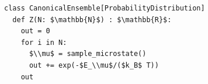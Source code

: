 \documentclass[border=10pt]{standalone}
\begin{document}
\begin{lstlisting}
class CanonicalEnsemble[ProbabilityDistribution]
  def Z(N: $\mathbb{N}$) : $\mathbb{R}$:
    out = 0
    for i in N:
      $\\mu$ = sample_microstate()
      out += exp(-$E_\\mu$/($k_B$ T))
    out
\end{lstlisting}
\end{document}

